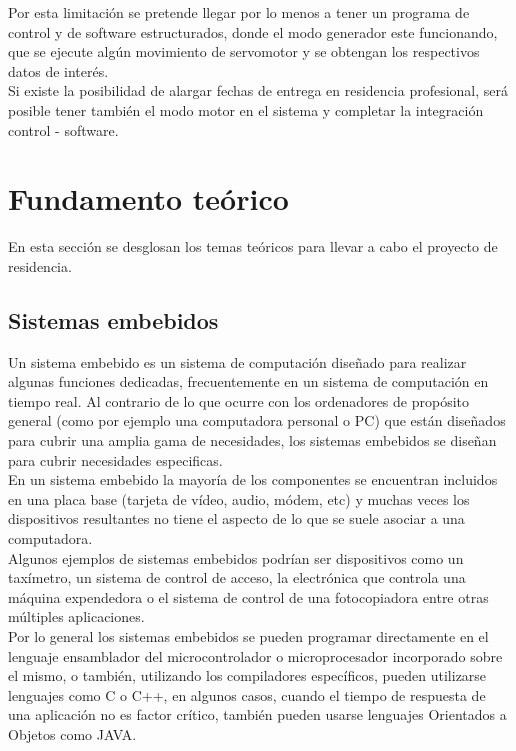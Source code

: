 \documentclass[12pt,titlepage]{article}
\begin{document}
Por esta limitación se pretende llegar por lo menos a tener un programa de control y de software estructurados,  donde el modo generador este funcionando, que se ejecute algún movimiento de servomotor y se obtengan los respectivos datos de interés. \\[2.5mm]
Si existe la posibilidad de alargar fechas de entrega en residencia profesional, será posible tener también el modo motor en el sistema y completar la integración control - software. \\

\newpage
\section{Fundamento teórico}
En esta sección se desglosan los temas teóricos para llevar a cabo el proyecto de residencia. \\
\subsection{Sistemas embebidos}
Un sistema embebido es un sistema de computación diseñado para realizar algunas funciones dedicadas, frecuentemente en un sistema de computación en tiempo real. Al contrario de lo que ocurre con los ordenadores de propósito general (como por ejemplo una computadora personal o PC) que están diseñados para cubrir una amplia gama de necesidades, los sistemas embebidos se diseñan para cubrir necesidades especificas. \\[2.5mm] En un sistema embebido la mayoría de los componentes se encuentran incluidos en una placa base (tarjeta de vídeo, audio, módem, etc) y muchas veces los dispositivos resultantes no tiene el aspecto de lo que se suele asociar a una computadora. \\[2.8mm] Algunos ejemplos de sistemas embebidos podrían ser dispositivos como un taxímetro, un sistema de control de acceso, la electrónica que controla una máquina expendedora o el sistema de control de una fotocopiadora entre otras múltiples aplicaciones. \\[2.8mm]

Por lo general los sistemas embebidos se pueden programar directamente en el lenguaje ensamblador del microcontrolador o microprocesador incorporado sobre el mismo, o también, utilizando los compiladores específicos, pueden utilizarse lenguajes como C o C++,  en algunos casos, cuando el tiempo de respuesta de una aplicación no es factor crítico, también pueden usarse lenguajes Orientados a Objetos como JAVA.  \\[2.8mm]
\end{document}
